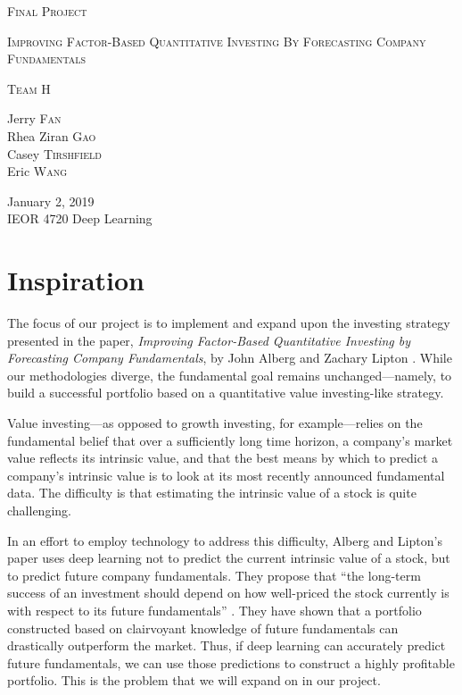 \documentclass[11pt, letterpaper, headings=standardclasses]{scrartcl}
\begin{document}
	\begin{titlepage}
		\begin{center}
			\vspace*{.5in}
	        
			\Huge
			\textsc{Final Project}
	        
			\Large
			\textsc{Improving Factor-Based Quantitative Investing By Forecasting Company Fundamentals}
			
			\vfill
			
			\normalsize
			\textsc{Team H}
			
			\vfill
			
			Jerry \textsc{Fan} \\
			Rhea Ziran \textsc{Gao} \\
			Casey \textsc{Tirshfield} \\
			Eric \textsc{Wang}
			\vfill
			
			
			January 2, 2019 \\
			IEOR 4720 Deep Learning
					
			\vspace*{.5in}
		\end{center}
	\end{titlepage}
	
	\tableofcontents
	
	\pagebreak
	
	\section{Inspiration}
	The focus of our project is to implement and expand upon the investing strategy presented in the paper, \textit{Improving Factor-Based Quantitative Investing by Forecasting Company Fundamentals}, by John Alberg and Zachary Lipton \cite{paper}. While our methodologies diverge, the fundamental goal remains unchanged---namely, to build a successful portfolio based on a quantitative value investing-like strategy.
	
	Value investing---as opposed to growth investing, for example---relies on the fundamental belief that over a sufficiently long time horizon, a company's market value reflects its intrinsic value, and that the best means by which to predict a company's intrinsic value is to look at its most recently announced fundamental data. The difficulty is that estimating the intrinsic value of a stock is quite challenging.
	
	In an effort to employ technology to address this difficulty, Alberg and Lipton's paper uses deep learning not to predict the current intrinsic value of a stock, but to predict future company fundamentals. They propose that ``the long-term success of an investment should depend on how well-priced the stock currently is with respect to its future fundamentals'' \cite[p. 2]{paper}. They have shown that a portfolio constructed based on clairvoyant knowledge of future fundamentals can drastically outperform the market. Thus, if deep learning can accurately predict future fundamentals, we can use those predictions to construct a highly profitable portfolio. This is the problem that we will expand on in our project.
		
\end{document}
